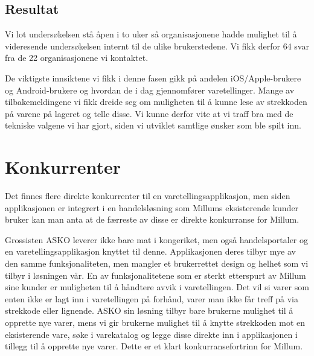 \subsection{\textbf{Resultat}}
Vi lot undersøkelsen stå åpen i to uker så organisasjonene hadde mulighet til å videresende undersøkelsen internt til de ulike brukerstedene. Vi fikk derfor 64 svar fra de 22 organisasjonene vi kontaktet.

De viktigste innsiktene vi fikk i denne fasen gikk på andelen iOS/Apple-brukere og Android-brukere og hvordan de i dag gjennomfører varetellinger. Mange av tilbakemeldingene vi fikk dreide seg om muligheten til å kunne lese av strekkoden på varene på lageret og telle disse. Vi kunne derfor vite at vi traff bra med de tekniske valgene vi har gjort, siden vi utviklet samtlige ønsker som ble spilt inn. 


\section{\textbf{Konkurrenter}}
Det finnes flere direkte konkurrenter til en varetellingsapplikasjon, men siden applikasjonen er integrert i en handelsløsning som Millums eksisterende kunder bruker kan man anta at de færreste av disse er direkte konkurranse for Millum. 

Grossisten ASKO leverer ikke bare mat i kongeriket, men også handelsportaler og en varetellingsapplikasjon knyttet til denne. Applikasjonen deres tilbyr mye av den samme funksjonaliteten, men mangler et brukerrettet design og helhet som vi tilbyr i løsningen vår. En av funksjonalitetene som er sterkt etterspurt av Millum sine kunder er muligheten til å håndtere avvik i varetellingen. Det vil si varer som enten ikke er lagt inn i varetellingen på forhånd, varer man ikke får treff på via strekkode eller lignende. ASKO sin løsning tilbyr bare brukerne mulighet til å opprette nye varer, mens vi gir brukerne mulighet til å knytte strekkoden mot en eksisterende vare, søke i varekatalog og legge disse direkte inn i applikasjonen i tillegg til å opprette nye varer. Dette er et klart konkurransefortrinn for Millum.